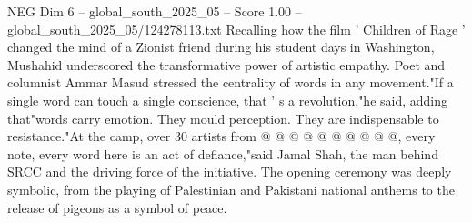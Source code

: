 \begin{textsample}{NEG Dim 6 – global\_south\_2025\_05 – Score 1.00 – global\_south\_2025\_05/124278113.txt}
Recalling how the film ' Children of Rage ' changed the mind of a Zionist friend during his student days in Washington, Mushahid underscored the transformative power of artistic empathy.
Poet and columnist Ammar Masud stressed the centrality of words in any movement."If a single word can touch a single conscience, that ' s a revolution,"he said, adding that"words carry emotion.
They mould perception.
They are indispensable to resistance."At the camp, over 30 artists from @ @ @ @ @ @ @ @ @ @, every note, every word here is an act of defiance,"said Jamal Shah, the man behind SRCC and the driving force of the initiative.
The opening ceremony was deeply symbolic, from the playing of Palestinian and Pakistani national anthems to the release of pigeons as a symbol of peace.

\end{textsample}
